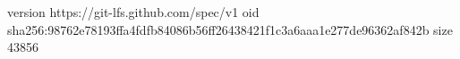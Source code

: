 version https://git-lfs.github.com/spec/v1
oid sha256:98762e78193ffa4fdfb84086b56ff26438421f1c3a6aaa1e277de96362af842b
size 43856
